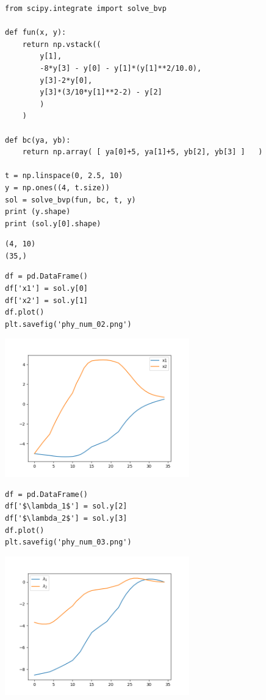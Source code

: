 \documentclass[12pt,fleqn]{article}\usepackage{../../common}
\begin{document}
\begin{verbatim}
from scipy.integrate import solve_bvp

def fun(x, y):
    return np.vstack((
        y[1],
        -8*y[3] - y[0] - y[1]*(y[1]**2/10.0),
        y[3]-2*y[0],
        y[3]*(3/10*y[1]**2-2) - y[2]
        )
    )

def bc(ya, yb):
    return np.array( [ ya[0]+5, ya[1]+5, yb[2], yb[3] ]   )
                     
t = np.linspace(0, 2.5, 10)
y = np.ones((4, t.size))
sol = solve_bvp(fun, bc, t, y)
print (y.shape)
print (sol.y[0].shape)
\end{verbatim}

\begin{verbatim}
(4, 10)
(35,)
\end{verbatim}

\begin{verbatim}
df = pd.DataFrame()
df['x1'] = sol.y[0]
df['x2'] = sol.y[1]
df.plot()
plt.savefig('phy_num_02.png')
\end{verbatim}

\includegraphics[height=6cm]{phy_num_02.png}

\begin{verbatim}
df = pd.DataFrame()
df['$\lambda_1$'] = sol.y[2]
df['$\lambda_2$'] = sol.y[3]
df.plot()
plt.savefig('phy_num_03.png')
\end{verbatim}

\includegraphics[height=6cm]{phy_num_03.png}
\end{document}

